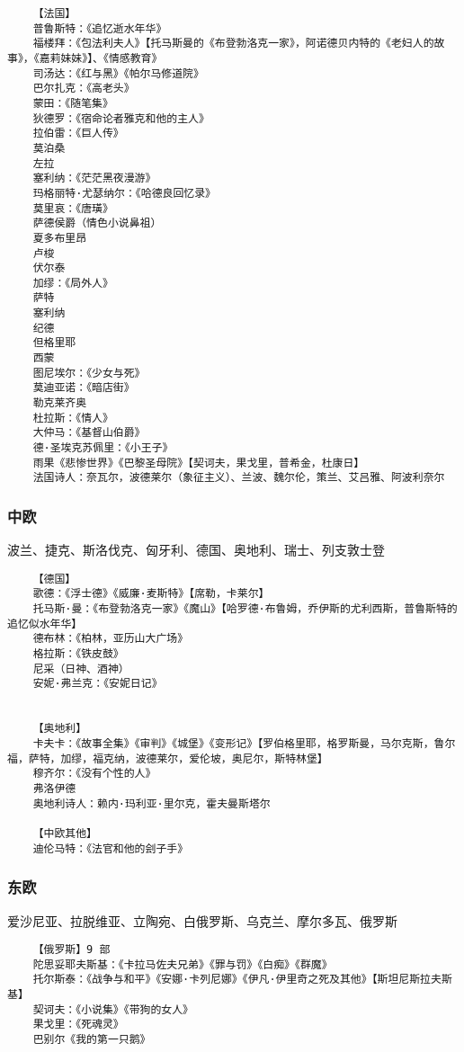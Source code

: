 \documentclass[UTF8]{../RepresentationUniverse}
\begin{document}
\begin{lstlisting}
    【法国】
    普鲁斯特：《追忆逝水年华》
    福楼拜：《包法利夫人》【托马斯曼的《布登勃洛克一家》，阿诺德贝内特的《老妇人的故事》，《嘉莉妹妹》】、《情感教育》
    司汤达：《红与黑》《帕尔马修道院》
    巴尔扎克：《高老头》
    蒙田：《随笔集》
    狄德罗：《宿命论者雅克和他的主人》
    拉伯雷：《巨人传》
    莫泊桑
    左拉
    塞利纳：《茫茫黑夜漫游》
    玛格丽特·尤瑟纳尔：《哈德良回忆录》
    莫里哀：《唐璜》
    萨德侯爵（情色小说鼻祖）
    夏多布里昂
    卢梭
    伏尔泰
    加缪：《局外人》
    萨特
    塞利纳
    纪德
    但格里耶
    西蒙
    图尼埃尔：《少女与死》
    莫迪亚诺：《暗店街》
    勒克莱齐奥
    杜拉斯：《情人》
    大仲马：《基督山伯爵》
    德·圣埃克苏佩里：《小王子》
    雨果《悲惨世界》《巴黎圣母院》【契诃夫，果戈里，普希金，杜康日】
    法国诗人：奈瓦尔，波德莱尔（象征主义）、兰波、魏尔伦，策兰、艾吕雅、阿波利奈尔
\end{lstlisting}

\subsubsection{中欧}
波兰、捷克、斯洛伐克、匈牙利、德国、奥地利、瑞士、列支敦士登
\begin{lstlisting}
    【德国】
    歌德：《浮士德》《威廉·麦斯特》【席勒，卡莱尔】
    托马斯·曼：《布登勃洛克一家》《魔山》【哈罗德·布鲁姆，乔伊斯的尤利西斯，普鲁斯特的追忆似水年华】
    德布林：《柏林，亚历山大广场》
    格拉斯：《铁皮鼓》
    尼采（日神、酒神）
    安妮·弗兰克：《安妮日记》


    【奥地利】
    卡夫卡：《故事全集》《审判》《城堡》《变形记》【罗伯格里耶，格罗斯曼，马尔克斯，鲁尔福，萨特，加缪，福克纳，波德莱尔，爱伦坡，奥尼尔，斯特林堡】
    穆齐尔：《没有个性的人》
    弗洛伊德
    奥地利诗人：赖内·玛利亚·里尔克，霍夫曼斯塔尔

    【中欧其他】
    迪伦马特：《法官和他的刽子手》
\end{lstlisting}



\subsubsection{东欧}
爱沙尼亚、拉脱维亚、立陶宛、白俄罗斯、乌克兰、摩尔多瓦、俄罗斯
\begin{lstlisting}
    【俄罗斯】9 部 
    陀思妥耶夫斯基：《卡拉马佐夫兄弟》《罪与罚》《白痴》《群魔》
    托尔斯泰：《战争与和平》《安娜·卡列尼娜》《伊凡·伊里奇之死及其他》【斯坦尼斯拉夫斯基】
    契诃夫：《小说集》《带狗的女人》
    果戈里：《死魂灵》
    巴别尔《我的第一只鹅》
\end{lstlisting}
\end{document}

